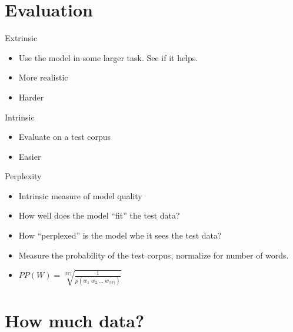 \documentclass[11pt,letterpaper]{article}
\begin{document}
\section{Evaluation}

Extrinsic

\begin{itemize}
  \item Use the model in some larger task.  See if it helps.
  \item More realistic
  \item Harder
\end{itemize}

Intrinsic

\begin{itemize}
  \item Evaluate on a test corpus
  \item Easier
\end{itemize}

Perplexity

\begin{itemize}
  \item Intrinsic measure of model quality
  \item How well does the model ``fit'' the test data?
  \item How ``perplexed'' is the model whe it sees the test data?
  \item Measure the probability of the test corpus, normalize for number of words.
  \item $PP(W) = \sqrt[|W|]{\frac{1}{p(w_1~w_2~...~w_{|W|})}}$
\end{itemize}



\section{How much data?}
\end{document}
